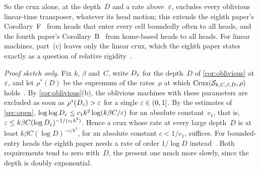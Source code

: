 So the crux alone, at the depth~$D$ and a rate above~$\varepsilon$, excludes every oblivious linear-time transposer, whatever its head
motion; this extends the eighth paper's Corollary~F~\cite[Corollary~6.1]{EighthPaper2026} from heads that enter every cell
boundedly often to all heads, and the fourth paper's Corollary~B~\cite[Corollary~4.23]{FourthPaper2026} from home-based heads to all
heads. For linear machines, part~(c) leaves only the linear crux, which the eighth paper states exactly as a question of
relative rigidity~\cite[Problem~10.6]{EighthPaper2026}.

\begin{remark}\label{rem:rate}
\emph{Proof sketch only.} Fix $k$, $\beta$ and~$C$, write $D_\varepsilon$ for the depth~$D$ of \cref{cor:oblivious} at~$\varepsilon$, and let
$\rho^*(D)$ be the supremum of the rates~$\rho$ at which $\mathrm{Crux}(\mathcal S_{k,C,\beta,D},\rho)$
holds~\cite[Remark~4.15]{FourthPaper2026}. By \cref{cor:oblivious}(b), the oblivious machines with these parameters are excluded
as soon as $\rho^*(D_\varepsilon)>\varepsilon$ for a single $\varepsilon\in(0,1]$. By the estimates of \cref{sec:open},
$\log\log D_\varepsilon\le c_1k^2\log(k\beta C/\varepsilon)$ for an absolute constant~$c_1$, that is, $\varepsilon\le k\beta C(\log D_\varepsilon)^{-1/(c_1k^2)}$.
Hence a crux whose rate at every large depth~$D$ is at least $k\beta C(\log D)^{-c/k^2}$, for an absolute constant $c<1/c_1$,
suffices. For bounded-entry heads the eighth paper needs a rate of order $1/\log D$ instead~\cite[Section~6.1]{EighthPaper2026}.
Both requirements tend to zero with~$D$, the present one much more slowly, since the depth is doubly exponential.
\end{remark}

